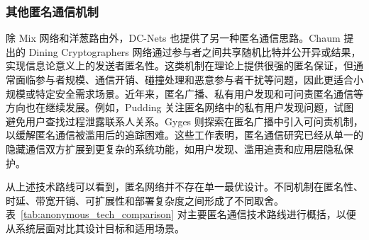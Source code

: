\subsubsection{其他匿名通信机制}
除 Mix 网络和洋葱路由外，DC-Nets 也提供了另一种匿名通信思路。Chaum 提出的 Dining Cryptographers 网络通过参与者之间共享随机比特并公开异或结果，实现信息论意义上的发送者匿名性\cite{chaum1988dining}。这类机制在理论上提供很强的匿名保证，但通常面临参与者规模、通信开销、碰撞处理和恶意参与者干扰等问题，因此更适合小规模或特定安全需求场景。近年来，匿名广播、私有用户发现和可问责匿名通信等方向也在继续发展。例如，Pudding 关注匿名网络中的私有用户发现问题，试图避免用户查找过程泄露联系人关系\cite{kocaougullar2024pudding}。Gyges 则探索在匿名广播中引入可问责机制，以缓解匿名通信被滥用后的追踪困难\cite{dong2025ring}。这些工作表明，匿名通信研究已经从单一的隐藏通信双方扩展到更复杂的系统功能，如用户发现、滥用追责和应用层隐私保护。

从上述技术路线可以看到，匿名网络并不存在单一最优设计。不同机制在匿名性、时延、带宽开销、可扩展性和部署复杂度之间形成了不同取舍。表~\ref{tab:anonymous_tech_comparison} 对主要匿名通信技术路线进行概括，以便从系统层面对比其设计目标和适用场景。

